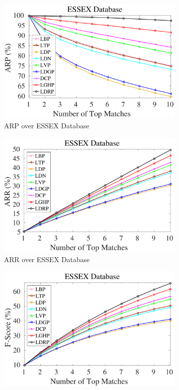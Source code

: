 \documentclass[a4paper]{article}
\begin{document}
\begin{figure}[!t]
  \begin{subfigure}{.25\textwidth}
    \centering
    \includegraphics[width=.98\linewidth]{essex-arp}
    \caption{ARP over ESSEX Database}
    \label{fig:essex-arp}
  \end{subfigure}%
    \begin{subfigure}{.25\textwidth}
    \centering
    \includegraphics[width=.98\linewidth]{essex-arr}
    \caption{ARR over ESSEX Database}
    \label{fig:essex-arr}
  \end{subfigure}%
    \begin{subfigure}{.25\textwidth}
    \centering
    \includegraphics[width=.98\linewidth]{essex-f}

\end{subfigure}
\end{figure}
\end{document}
